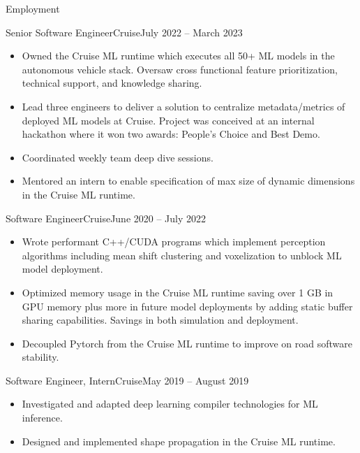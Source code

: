 \documentclass[termes]{resume}
\begin{document}
	\begin{cvsection}{Employment}
		\begin{cvsubsection}{Senior Software Engineer}{Cruise}{July 2022 -- March 2023}		
			\begin{itemize}
				\item Owned the Cruise ML runtime which executes all 50+ ML models in the autonomous vehicle stack. Oversaw cross functional feature prioritization, technical support, and knowledge sharing.
				\item Lead three engineers to deliver a solution to centralize metadata/metrics of deployed ML models at Cruise. Project was conceived at an internal hackathon where it won two awards: People's Choice and Best Demo.
				\item Coordinated weekly team deep dive sessions.
				\item Mentored an intern to enable specification of max size of dynamic dimensions in the Cruise ML runtime.
			\end{itemize}
		\end{cvsubsection}
		
		\begin{cvsubsection}{Software Engineer}{Cruise}{June 2020 -- July 2022}		
			\begin{itemize}
				\item Wrote performant C++/CUDA programs which implement perception algorithms including mean shift clustering and voxelization to unblock ML model deployment.
				\item Optimized memory usage in the Cruise ML runtime saving over 1 GB in GPU memory plus more in future model deployments by adding static buffer sharing capabilities. Savings in both simulation and deployment.
 				\item Decoupled Pytorch from the Cruise ML runtime to improve on road software stability.
			\end{itemize}
		\end{cvsubsection}
		
		\begin{cvsubsection}{Software Engineer, Intern}{Cruise}{May 2019 -- August 2019}	
			\begin{itemize}
				\item Investigated and adapted deep learning compiler technologies for ML inference.
				\item Designed and implemented shape propagation in the Cruise ML runtime.
			\end{itemize}
		\end{cvsubsection}
		

\end{cvsection}
\end{document}
